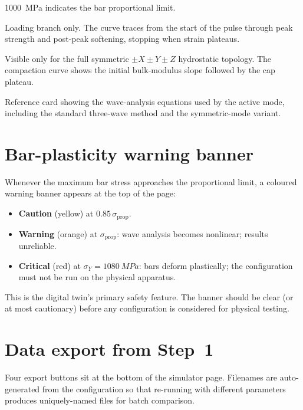 \documentclass[11pt,a4paper,openany]{book}
\providecommand{\SI}[2]{\qty{#1}{#2}}
\theoremstyle{handbook}
\newcommand{\sig}{\sigma}
\newcommand{\eps}{\varepsilon}
\newcommand{\sigprop}{\sig_{\text{prop}}}
\begin{document}
\begin{description}[leftmargin=2em,style=nextline]
    \SI{1000}{MPa} indicates the bar proportional limit.
  \item[$\sig$--$\eps$ curve] Loading branch only. The curve traces from
    the start of the pulse through peak strength and post-peak softening,
    stopping when strain plateaus.
  \item[$p$--$\eps_v$] Visible only for the full symmetric
    $\pm X\pm Y\pm Z$ hydrostatic topology. The compaction curve shows the
    initial bulk-modulus slope followed by the cap plateau.
  \item[Equations] Reference card showing the wave-analysis equations
    used by the active mode, including the standard three-wave method
    and the symmetric-mode variant.
\end{description}

\section{Bar-plasticity warning banner}

Whenever the maximum bar stress approaches the proportional limit, a
coloured warning banner appears at the top of the page:
\begin{itemize}[leftmargin=*,itemsep=2pt]
  \item \textcolor{warnorange}{\textbf{Caution}} (yellow) at
        $0.85\,\sigprop$.
  \item \textcolor{warnorange}{\textbf{Warning}} (orange) at $\sigprop$:
        wave analysis becomes nonlinear; results unreliable.
  \item \textcolor{dangerred}{\textbf{Critical}} (red) at
        $\sig_Y=\SI{1080}{MPa}$: bars deform plastically; the
        configuration must not be run on the physical apparatus.
\end{itemize}
This is the digital twin's primary safety feature. The banner should be
clear (or at most cautionary) before any configuration is considered for
physical testing.

\section{Data export from Step~1}

Four export buttons sit at the bottom of the simulator page. Filenames are
auto-generated from the configuration so that re-running with different
parameters produces uniquely-named files for batch comparison.
\end{document}
